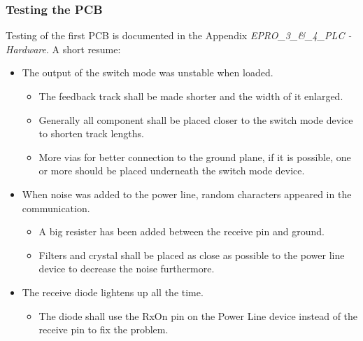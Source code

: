 \subsubsection{Testing the PCB}
Testing of the first PCB is documented in the Appendix \textit{EPRO\_3\_\&\_4\_PLC - Hardware}. A short resume:
\begin{itemize}
	\item The output of the switch mode was unstable when loaded. 
	\begin{itemize}
		\item The feedback track shall be made shorter and the width of it enlarged. 
		\item Generally all component shall be placed closer to the switch mode device to shorten track lengths. 
		\item More vias for better connection to the ground plane, if it is possible, one or more should be placed underneath the switch mode device.
	\end{itemize}
	\item When noise was added to the power line, random characters appeared in the communication.
	\begin{itemize}
		\item A big resister has been added between the receive pin and ground.
		\item Filters and crystal shall be placed as close as possible to the power line device to decrease the noise furthermore.
	\end{itemize} 
	\item The receive diode lightens up all the time.
	\begin{itemize}
		\item The diode shall use the RxOn pin on the Power Line device instead of the receive pin to fix the problem.
	\end{itemize}
\end{itemize}

